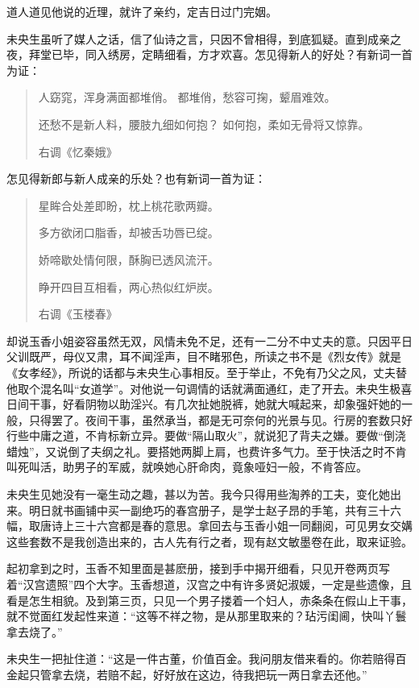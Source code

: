 \documentclass[a4paper,12pt,UTF8,twoside]{ctexbook}
\begin{document}
道人道见他说的近理，就许了亲约，定吉日过门完姻。

未央生虽听了媒人之话，信了仙诗之言，只因不曾相得，到底狐疑。直到成亲之夜，拜堂已毕，同入绣房，定睛细看，方才欢喜。怎见得新人的好处？有新词一首为证：

\begin{quotation}
人窈窕，浑身满面都堆俏。
都堆俏，愁容可掬，颦眉难效。

还愁不是新人料，腰肢九细如何抱？
如何抱，柔如无骨将又惊靠。

右调《忆秦娥》
\end{quotation}

怎见得新郎与新人成亲的乐处？也有新词一首为证：

\begin{quotation}
星眸合处差即盼，枕上桃花歌两瓣。

多方欲闭口脂香，却被舌功唇已绽。

娇啼歇处情何限，酥胸已透风流汗。

睁开四目互相看，两心热似红炉炭。

右调《玉楼春》
\end{quotation}

却说玉香小姐姿容虽然无双，风情未免不足，还有一二分不中丈夫的意。只因平日父训既严，母仪又肃，耳不闻淫声，目不睹邪色，所读之书不是《烈女传》就是《女孝经》，所说的话都与未央生心事相反。至于举止，不免有乃父之风，丈夫替他取个混名叫“女道学”。对他说一句调情的话就满面通红，走了开去。未央生极喜日间干事，好看阴物以助淫兴。有几次扯她脱裤，她就大喊起来，却象强奸她的一般，只得罢了。夜间干事，虽然承当，都是无可奈何的光景与见。行房的套数只好行些中庸之道，不肯标新立异。要做“隔山取火”，就说犯了背夫之嫌。要做“倒浇蜡烛”，又说倒了夫纲之礼。要搭她两脚上肩，也费许多气力。至于快活之时不肯叫死叫活，助男子的军威，就唤她心肝命肉，竟象哑妇一般，不肯答应。

未央生见她没有一毫生动之趣，甚以为苦。我今只得用些淘养的工夫，变化她出来。明日就书画铺中买一副绝巧的春宫册子，是学士赵子昂的手笔，共有三十六幅，取唐诗上三十六宫都是春的意思。拿回去与玉香小姐一同翻阅，可见男女交媾这些套数不是我创造出来的，古人先有行之者，现有赵文敏墨卷在此，取来证验。

起初拿到之时，玉香不知里面是甚麽册，接到手中揭开细看，只见开卷两页写着“汉宫遗照”四个大字。玉香想道，汉宫之中有许多贤妃淑媛，一定是些遗像，且看是怎生相貌。及到第三页，只见一个男子搂着一个妇人，赤条条在假山上干事，就不觉面红发起性来道：“这等不祥之物，是从那里取来的？玷污闺阃，快叫丫鬟拿去烧了。”

未央生一把扯住道：“这是一件古董，价值百金。我问朋友借来看的。你若赔得百金起只管拿去烧，若赔不起，好好放在这边，待我把玩一两日拿去还他。”
\end{document}
